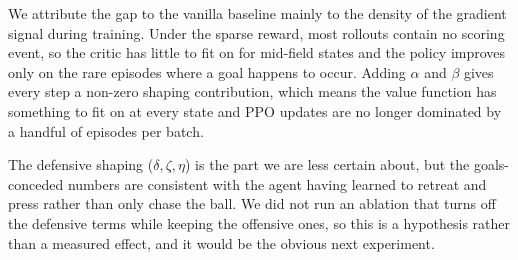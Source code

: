 \documentclass{article}
\begin{document}
We attribute the gap to the vanilla baseline mainly to the density of the gradient signal during training. Under the sparse reward, most rollouts contain no scoring event, so the critic has little to fit on for mid-field states and the policy improves only on the rare episodes where a goal happens to occur. Adding $\alpha$ and $\beta$ gives every step a non-zero shaping contribution, which means the value function has something to fit on at every state and PPO updates are no longer dominated by a handful of episodes per batch.

The defensive shaping ($\delta, \zeta, \eta$) is the part we are less certain about, but the goals-conceded numbers are consistent with the agent having learned to retreat and press rather than only chase the ball. We did not run an ablation that turns off the defensive terms while keeping the offensive ones, so this is a hypothesis rather than a measured effect, and it would be the obvious next experiment.




\end{document}
